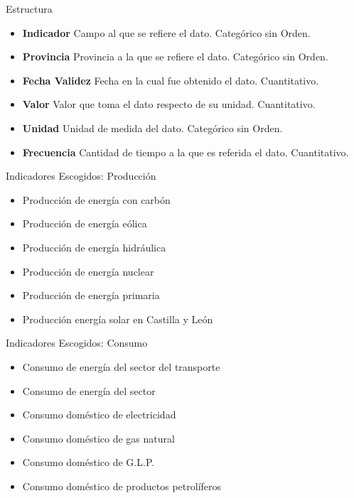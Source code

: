 \documentclass{beamer}
\begin{document}
		\begin{frame}{Estructura}
		
			\begin{itemize}
			
				\item {\bf Indicador } Campo al que se refiere el dato. Categórico sin Orden.
				
				\item {\bf Provincia } Provincia a la que se refiere el dato. Categórico sin Orden.
				
				\item {\bf Fecha Validez } Fecha en la cual fue obtenido el dato. Cuantitativo.
				
				\item {\bf Valor } Valor que toma el dato respecto de su unidad. Cuantitativo.
				
				\item {\bf Unidad } Unidad de medida del dato. Categórico sin Orden.
				
				\item {\bf Frecuencia } Cantidad de tiempo a la que es referida el dato. Cuantitativo.
			\end{itemize}
		
		\end{frame}
		
		\begin{frame}{Indicadores Escogidos: Producción}
		
			\begin{itemize}
				\item Producción de energía con carbón
				\item Producción de energía eólica
				\item Producción de energía hidráulica
				\item Producción de energía nuclear
				\item Producción de energía primaria
				\item Producción energía solar en Castilla y León	
			\end{itemize}
				
		\end{frame}
		
		\begin{frame}{Indicadores Escogidos: Consumo}
		
			\begin{itemize}
				\item Consumo de energía del sector del transporte
				\item Consumo de energía del sector
				\item Consumo doméstico de electricidad
				\item Consumo doméstico de gas natural
				\item Consumo doméstico de G.L.P.
				\item Consumo doméstico de productos petrolíferos
			\end{itemize}
							
		\end{frame}
		
\end{document}
